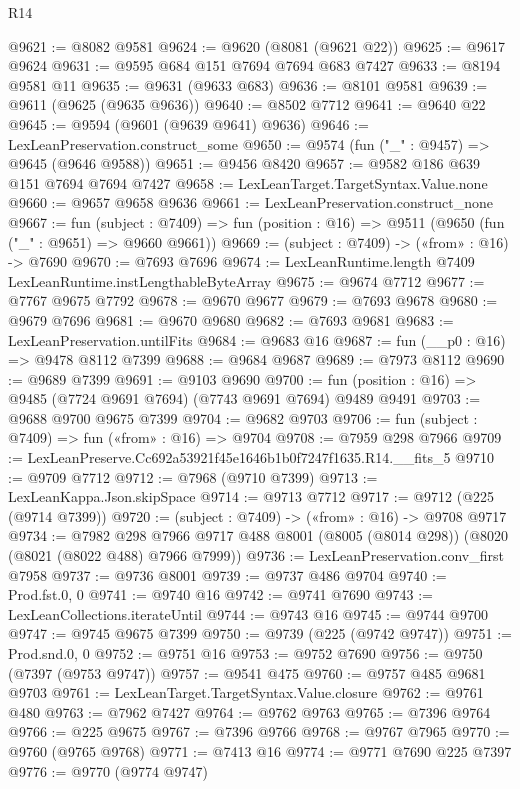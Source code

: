 \begin{lexlean}{R14}
\begin{coremodule}
@9621 := @8082 @9581
@9624 := @9620 (@8081 (@9621 @22))
@9625 := @9617 @9624
@9631 := @9595 @684 @151 @7694 @7694 @683 @7427
@9633 := @8194 @9581 @11
@9635 := @9631 (@9633 @683)
@9636 := @8101 @9581
@9639 := @9611 (@9625 (@9635 @9636))
@9640 := @8502 @7712
@9641 := @9640 @22
@9645 := @9594 (@9601 (@9639 @9641) @9636)
@9646 := LexLeanPreservation.construct_some
@9650 := @9574 (fun ("_" : @9457) => @9645 (@9646 @9588))
@9651 := @9456 @8420
@9657 := @9582 @186 @639 @151 @7694 @7694 @7427
@9658 := LexLeanTarget.TargetSyntax.Value.none
@9660 := @9657 @9658 @9636
@9661 := LexLeanPreservation.construct_none
@9667 := fun (subject : @7409) =>
  fun (position : @16) => @9511 (@9650 (fun ("_" : @9651) => @9660 @9661))
@9669 := (subject : @7409) -> («from» : @16) -> @7690
@9670 := @7693 @7696
@9674 := LexLeanRuntime.length @7409 LexLeanRuntime.instLengthableByteArray
@9675 := @9674 @7712
@9677 := @7767 @9675 @7792
@9678 := @9670 @9677
@9679 := @7693 @9678
@9680 := @9679 @7696
@9681 := @9670 @9680
@9682 := @7693 @9681
@9683 := LexLeanPreservation.untilFits
@9684 := @9683 @16
@9687 := fun (__p0 : @16) => @9478 @8112 @7399
@9688 := @9684 @9687
@9689 := @7973 @8112
@9690 := @9689 @7399
@9691 := @9103 @9690
@9700 := fun (position : @16) => @9485 (@7724 @9691 @7694) (@7743 @9691 @7694) @9489 @9491
@9703 := @9688 @9700 @9675 @7399
@9704 := @9682 @9703
@9706 := fun (subject : @7409) => fun («from» : @16) => @9704
@9708 := @7959 @298 @7966
@9709 := LexLeanPreserve.Cc692a53921f45e1646b1b0f7247f1635.R14.__fits_5
@9710 := @9709 @7712
@9712 := @7968 (@9710 @7399)
@9713 := LexLeanKappa.Json.skipSpace
@9714 := @9713 @7712
@9717 := @9712 (@225 (@9714 @7399))
@9720 := (subject : @7409) -> («from» : @16) -> @9708 @9717
@9734 := @7982
    @298
    @7966
    @9717
    @488
    @8001
    (@8005 (@8014 @298))
    (@8020 (@8021 (@8022 @488) @7966 @7999))
@9736 := LexLeanPreservation.conv_first @7958
@9737 := @9736 @8001
@9739 := @9737 @486 @9704
@9740 := Prod.fst.{0, 0}
@9741 := @9740 @16
@9742 := @9741 @7690
@9743 := LexLeanCollections.iterateUntil
@9744 := @9743 @16
@9745 := @9744 @9700
@9747 := @9745 @9675 @7399
@9750 := @9739 (@225 (@9742 @9747))
@9751 := Prod.snd.{0, 0}
@9752 := @9751 @16
@9753 := @9752 @7690
@9756 := @9750 (@7397 (@9753 @9747))
@9757 := @9541 @475
@9760 := @9757 @485 @9681 @9703
@9761 := LexLeanTarget.TargetSyntax.Value.closure
@9762 := @9761 @480
@9763 := @7962 @7427
@9764 := @9762 @9763
@9765 := @7396 @9764
@9766 := @225 @9675
@9767 := @7396 @9766
@9768 := @9767 @7965
@9770 := @9760 (@9765 @9768)
@9771 := @7413 @16
@9774 := @9771 @7690 @225 @7397
@9776 := @9770 (@9774 @9747)

\end{coremodule}
\end{lexlean}
